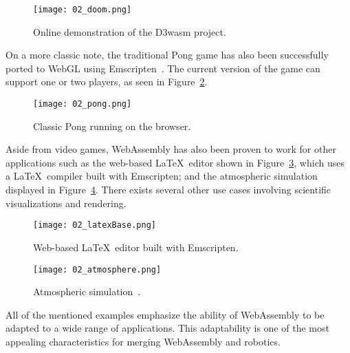         \begin{figure}[htbp]
            \centering
            \texttt{[image: 02\_doom.png]}
            \caption{Online demonstration of the \ac{D3wasm} project.}
            \label{fig:doom}
        \end{figure}

        On a more classic note, the traditional Pong game has also been successfully ported to WebGL using Emscripten~\cite{pong}. The current version of the game can support one or two players, as seen in Figure~\ref{fig:pong}. 

        \begin{figure}[htbp]
            \centering
            \texttt{[image: 02\_pong.png]}
            \caption{Classic Pong running on the browser.}
            \label{fig:pong}
        \end{figure}

        Aside from video games, WebAssembly has also been proven to work for other applications such as the web-based \LaTeX\ editor shown in Figure~\ref{fig:latex}, which uses a \LaTeX\ compiler built with Emscripten; and the atmospheric simulation displayed in Figure~\ref{fig:atmos}. There exists several other use cases involving scientific visualizations and rendering. 

        \begin{figure}[htbp]
            \centering
            \texttt{[image: 02\_latexBase.png]}
            \caption{Web-based \LaTeX\ editor built with Emscripten.}
            \label{fig:latex}
        \end{figure}



        \begin{figure}[htbp]
            \centering
            \texttt{[image: 02\_atmosphere.png]}
            \caption{Atmospheric simulation~\cite{atmos}.}
            \label{fig:atmos}
        \end{figure}

        All of the mentioned examples emphasize the ability of WebAssembly to be adapted to a wide range of applications. This adaptability is one of the most appealing characteristics for merging WebAssembly and robotics.

